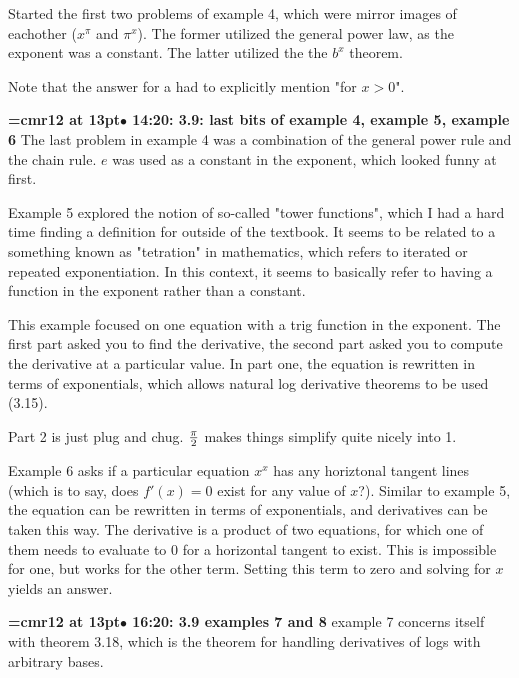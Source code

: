 Started the first two problems of example 4, which were mirror images of eachother ($x^\pi$ and $\pi^x$). The former utilized the general power law, as the exponent was a constant. The latter utilized the the $b^x$ theorem.
\par

Note that the answer for a had to explicitly mention "for $x > 0$".
\par

{\smallskip\noindent\bf\font\titlefont=cmr12 at 13pt\titlefont $\bullet$ 14:20: 3.9: last bits of example 4, example 5, example 6}\smallskip
The last problem in example 4 was a combination of the general power rule and the chain rule. $e$ was used as a constant in the exponent, which looked funny at first.
\par

Example 5 explored the notion of so-called "tower functions", which I had a hard time finding a definition for outside of the textbook. It seems to be related to a something known as "tetration" in mathematics, which refers to iterated or repeated exponentiation. In this context, it seems to basically refer to having a function in the exponent rather than a constant.
\par

This example focused on one equation with a trig function in the exponent. The first part asked you to find the derivative, the second part asked you to compute the derivative at a particular value. In part one, the equation is rewritten in terms of exponentials, which allows natural log derivative theorems to be used (3.15).
\par

Part 2 is just plug and chug. $\pi \over 2$ makes things simplify quite nicely into 1.
\par

Example 6 asks if a particular equation $x^x$ has any horiztonal tangent lines (which is to say, does $f'(x) = 0$ exist for any value of $x$?). Similar to example 5, the equation can be rewritten in terms of exponentials, and derivatives can be taken this way. The derivative is a product of two equations, for which one of them needs to evaluate to 0 for a horizontal tangent to exist. This is impossible for one, but works for the other term. Setting this term to zero and solving for $x$ yields an answer.
\par

{\smallskip\noindent\bf\font\titlefont=cmr12 at 13pt\titlefont $\bullet$ 16:20: 3.9 examples 7 and 8}\smallskip
example 7 concerns itself with theorem 3.18, which is the theorem for handling derivatives of logs with arbitrary bases.
\par

